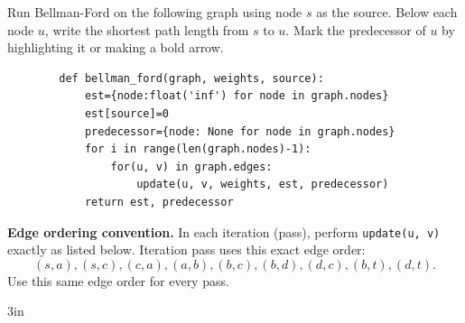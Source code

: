 \begin{prob}
    Run Bellman-Ford on the following graph using node $s$ as the source.
    Below each node $u$, write the shortest path length from $s$ to $u$.
    Mark the predecessor of $u$ by highlighting it or making a bold arrow.
    \begin{verbatim}
        def bellman_ford(graph, weights, source):
            est={node:float('inf') for node in graph.nodes}
            est[source]=0
            predecessor={node: None for node in graph.nodes}
            for i in range(len(graph.nodes)-1):
                for(u, v) in graph.edges:
                    update(u, v, weights, est, predecessor)
            return est, predecessor
    \end{verbatim}

    \textbf{Edge ordering convention.}
    In each iteration (pass), perform \texttt{update(u, v)} exactly as listed below.
    Iteration pass uses this exact edge order:
    \[
        (s,a), (s,c), (c,a), (a,b), (b,c), (b,d), (d,c), (b,t), (d,t).
    \]
    Use this same edge order for every pass.

    \begin{center}
    \end{center}
    \begin{responsebox}{3in}
    \end{responsebox}


\end{prob}
